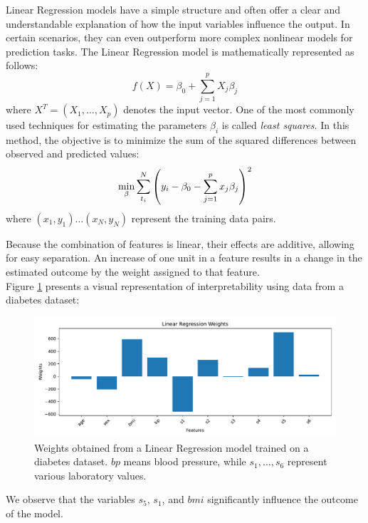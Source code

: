 Linear Regression models have a simple structure and often offer a clear and understandable explanation of how the input variables influence the output. In certain scenarios, they can even outperform more complex nonlinear models for prediction tasks.
The Linear Regression model is mathematically represented as follows:
\begin{equation}
    f(X) = \beta_0 + \sum_{j=1}^p X_j\beta_j
\end{equation}
 where $X^T=(X_1,\dots,X_p)$ denotes the input vector.
One of the most commonly used techniques for estimating the parameters $\beta_i$ is called \textit{least squares}. In this method, the objective is to minimize the sum of the squared differences between observed and predicted values:
\begin{equation}
    \min_{\beta} \sum_{t_i}^N \left(y_i-\beta_0-\sum_{j=1}^p x_j\beta_j\right)^2
    \label{eq:ls_lr}
\end{equation}
where $(x_1,y_1)\dots(x_N,y_N)$ represent the training data pairs.\cite{hastie2009elements}

Because the combination of features is linear, their effects are additive, allowing for easy separation. An increase of one unit in a feature results in a change in the estimated outcome by the weight assigned to that feature. \\
Figure \ref{fig:LRW} presents a visual representation of interpretability using data from a diabetes dataset\cite{diabetes_dataset}:

\begin{figure}[H]
    \centering
    \includegraphics[width=1\linewidth]{pics/Linear_Regression_Weights.pdf}
    \caption[Weights of LR model.]{Weights obtained from a Linear Regression model trained on a diabetes dataset. $bp$ means blood pressure, while $s_1, \dots, s_6$ represent various laboratory values.}
    \label{fig:LRW}
\end{figure}

We observe that the variables $s_5$, $s_1$, and $bmi$ significantly influence the outcome of the model.

